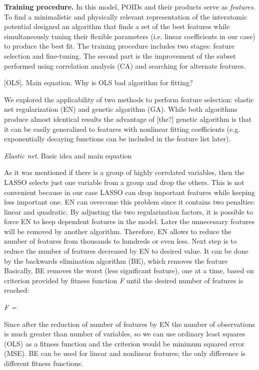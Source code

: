 \documentclass[aps,prl,reprint,amsmath,amssymb,nature]{revtex4-1}
\begin{document}
\textbf{Training procedure.} In this model, POIDs and their products serve as \textit{features}. 
To find a minimalistic and physically relevant representation of the interatomic potential designed an algorithm that finds a set of the best features while simultaneously tuning their flexible parameters (i.e. linear coefficients in our case) to produce the best fit. 
The training procedure includes two stages: feature selection and fine-tuning. 
\red The second part is the improvement of the subset performed using correlation analysis (CA) and searching for alternate features. \old

$[$OLS$]$. Main equation. Why is OLS bad algorithm for fitting?

We explored the applicability of two methods to perform feature 
selection: elastic net regularization (EN) and genetic algorithm (GA). 
While both algorithms produce almost identical results the advantage of 
$[$the?$]$ genetic algorithm is that it can be easily generalized to 
features with nonlinear fitting coefficients (e.g. exponentially 
decaying functions can be included in the feature list later).

\textit{Elastic net}. Basic idea and main equation

As it was mentioned if there is a group of highly correlated variables, 
then the LASSO selects just one variable from a group and drop the 
others. This is not convenient because in our case LASSO can drop 
important features while keeping less important one. EN can overcome 
this problem since it contains two penalties: linear and quadratic. By 
adjusting the two regularization factors, it is possible to force EN to 
keep dependent features in the model. Later the unnecessary features 
will be removed by another algorithm. Therefore, EN allows to reduce the 
number of features from thousands to hundreds or even less. Next step is 
to reduce the number of features decreased by EN to desired value. It 
can be done by the backwards elimination algorithm (BE), which removes 
the feature Basically, BE removes the worst (less significant feature), 
one at a time, based on criterion provided by fitness function \textit{
F} until the desired number of features is reached:

\textit{F = }

 Since after the reduction of number of features by EN the number of 
observations is much greater than number of variables, so we can use 
ordinary least squares (OLS) as a fitness function and the criterion 
would be minimum squared error (MSE). BE can be used for linear and 
nonlinear features; the only difference is different fitness functions.
\end{document}
